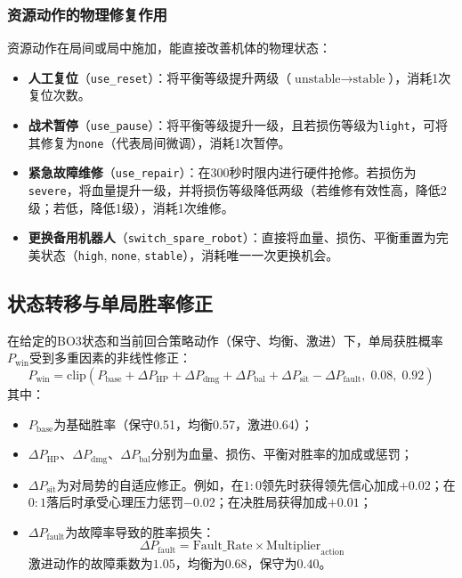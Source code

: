 \documentclass[a4paper,12pt]{article}
\numberwithin{equation}{section}
\numberwithin{table}{section}
\numberwithin{figure}{section}
\begin{document}
\subsubsection{资源动作的物理修复作用}

资源动作在局间或局中施加，能直接改善机体的物理状态：
\begin{itemize}
    \item \textbf{人工复位}（\texttt{use\_reset}）：将平衡等级提升两级（$\text{unstable} \rightarrow \text{stable}$），消耗1次复位次数。
    \item \textbf{战术暂停}（\texttt{use\_pause}）：将平衡等级提升一级，且若损伤等级为\texttt{light}，可将其修复为\texttt{none}（代表局间微调），消耗1次暂停。
    \item \textbf{紧急故障维修}（\texttt{use\_repair}）：在300秒时限内进行硬件抢修。若损伤为\texttt{severe}，将血量提升一级，并将损伤等级降低两级（若维修有效性高，降低2级；若低，降低1级），消耗1次维修。
    \item \textbf{更换备用机器人}（\texttt{switch\_spare\_robot}）：直接将血量、损伤、平衡重置为完美状态（\texttt{high}, \texttt{none}, \texttt{stable}），消耗唯一一次更换机会。
\end{itemize}

\subsection{状态转移与单局胜率修正}

在给定的BO3状态和当前回合策略动作（保守、均衡、激进）下，单局获胜概率$P_{\text{win}}$受到多重因素的非线性修正：
\begin{equation}
    P_{\text{win}} = \text{clip}\left( P_{\text{base}} + \Delta P_{\text{HP}} + \Delta P_{\text{dmg}} + \Delta P_{\text{bal}} + \Delta P_{\text{sit}} - \Delta P_{\text{fault}},\; 0.08,\; 0.92 \right)
    \label{eq:pwin}
\end{equation}
其中：
\begin{itemize}
    \item $P_{\text{base}}$为基础胜率（保守0.51，均衡0.57，激进0.64）；
    \item $\Delta P_{\text{HP}}$、$\Delta P_{\text{dmg}}$、$\Delta P_{\text{bal}}$分别为血量、损伤、平衡对胜率的加成或惩罚；
    \item $\Delta P_{\text{sit}}$为对局势的自适应修正。例如，在$1:0$领先时获得领先信心加成$+0.02$；在$0:1$落后时承受心理压力惩罚$-0.02$；在决胜局获得加成$+0.01$；
    \item $\Delta P_{\text{fault}}$为故障率导致的胜率损失：
    \begin{equation}
        \Delta P_{\text{fault}} = \text{Fault\_Rate} \times \text{Multiplier}_{\text{action}}
        \label{eq:pfault}
    \end{equation}
    激进动作的故障乘数为$1.05$，均衡为$0.68$，保守为$0.40$。
\end{itemize}
\end{document}
